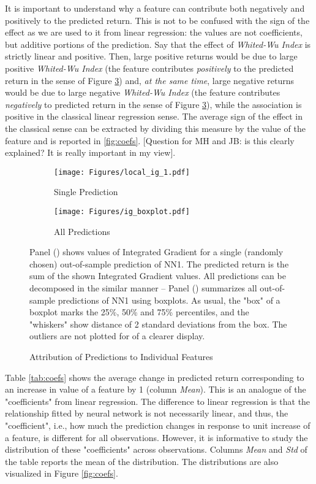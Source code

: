 	It is important to understand why a feature can contribute both negatively and positively to the predicted return. This is not to be confused with the sign of the effect as we are used to it from linear regression: the values are not coefficients, but additive portions of the prediction. Say that the effect of \textit{Whited-Wu Index} is strictly linear and positive. Then, large positive returns would be due to large positive\textit{ Whited-Wu Index} (the feature contributes \textit{positively} to the predicted return in the sense of Figure \ref{fig:local_ig}) and, \textit{at the same time}, large negative returns would be due to large negative \textit{Whited-Wu Index} (the feature contributes \textit{negatively} to predicted return in the sense of Figure \ref{fig:local_ig}), while the association is positive in the classical linear regression sense. The average sign of the effect in the classical sense can be extracted by dividing this measure by the value of the feature and is reported in \ref{fig:coefs}. [Question for MH and JB: is this clearly explained? It is really important in my view]. 
		
	\begin{figure}	
		\centering		
		\begin{subfigure}[t]{\textwidth}
			\texttt{[image: Figures/local\_ig\_1.pdf]}
			\caption{Single Prediction}
			\label{fig:local_ig_1}
		\end{subfigure}
		
		\begin{subfigure}[t]{\textwidth}
			\centering
			\texttt{[image: Figures/ig\_boxplot.pdf]}
			\caption{All Predictions}
			\label{fig:local_ig_boxplot}
		\end{subfigure}
		\caption{Attribution of Predictions to Individual Features}
		\medskip
		\small
		Panel () shows values of Integrated Gradient for a single (randomly chosen) out-of-sample prediction of NN1. The predicted return is the sum of the shown Integrated Gradient values. All predictions can be decomposed in the similar manner -- Panel () summarizes all out-of-sample predictions of NN1 using boxplots. As usual, the "box" of a boxplot marks the 25\%, 50\% and 75\% percentiles, and the "whiskers" show distance of 2 standard deviations from the box. The outliers are not plotted for of a clearer display.
		\label{fig:local_ig}
	\end{figure}

	Table \ref{tab:coefs} shows the average change in predicted return corresponding to an increase in value of a feature by 1 (column \textit{Mean}). This is an analogue of the "coefficients" from linear regression. The difference to linear regression is that the relationship fitted by neural network is not necessarily linear, and thus, the "coefficient", i.e., how much the prediction changes in response to unit increase of a feature, is different for all observations. However, it is informative to study the distribution of these "coefficients" across observations. Columns \textit{Mean} and \textit{Std} of the table reports the mean of the distribution. The distributions are also visualized in Figure \ref{fig:coefs}.  
	
